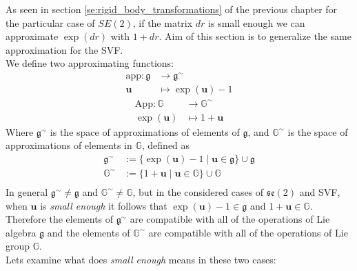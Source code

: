 \noindent
As seen in section \ref{se:rigid_body_transformations} of the previous chapter for the particular case of $SE(2)$, if the matrix $dr$ is small enough we can approximate $\exp(dr)$ with $1 + dr$. Aim of this section is to generalize the same approximation for the SVF.  \\
We define two approximating functions:
\begin{align*}
\text{app} : \mathfrak{g} & \longrightarrow  \mathfrak{g} ^{\sim}    \\
\mathbf{u} &\longmapsto \exp(\mathbf{u}) - 1
\end{align*}
\begin{align*}
\text{App} : \mathbb{G} & \longrightarrow  \mathbb{G}^{\sim}   \\
\exp(\mathbf{u}) &\longmapsto 1 + \mathbf{u}
\end{align*}
Where $\mathfrak{g} ^{\sim}$ is the space of approximations of elements of $\mathfrak{g} $, and $\mathbb{G}^{\sim} $ is the space of approximations of elements in $\mathbb{G}$, defined as
\begin{align*}
\mathfrak{g} ^{\sim} & := \{ \exp(\mathbf{u}) - 1 \mid \mathbf{u}\in \mathfrak{g}\} \cup \mathfrak{g} \\
\mathbb{G}^{\sim}  & := \{ 1 + \mathbf{u} \mid \mathbf{u}\in \mathbb{G}\} \cup \mathbb{G} \\
\end{align*}
In general $\mathfrak{g} ^{\sim} \neq \mathfrak{g}$ and $\mathbb{G}^{\sim} \neq \mathbb{G}$, but in the considered cases of $\mathfrak{se}(2)$ and SVF, when $\mathbf{u}$ is \emph{small enough}
it follows that $\exp(\mathbf{u}) - 1 \in \mathfrak{g} $ and $1 + \mathbf{u}\in\mathbb{G}$. Therefore the elements of $\mathfrak{g}^{\sim} $ are compatible with all of the operations of Lie algebra $\mathfrak{g}$ and the elements of $\mathbb{G}^{\sim}$ are compatible with all of the operations of Lie group $\mathbb{G}$.\\
Lets examine what does \emph{small enough} means in these two cases:
